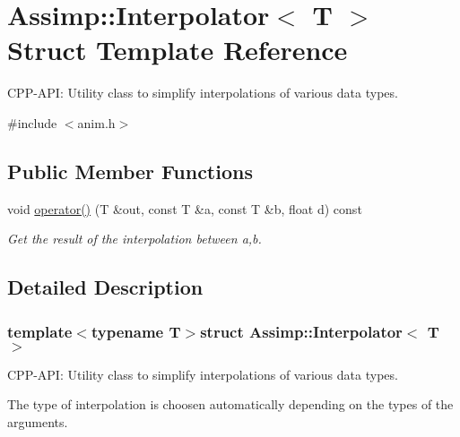 \hypertarget{struct_assimp_1_1_interpolator}{\section{Assimp\-:\-:Interpolator$<$ T $>$ Struct Template Reference}
\label{struct_assimp_1_1_interpolator}
}


C\-P\-P-\/\-A\-P\-I\-: Utility class to simplify interpolations of various data types.  




{\ttfamily \#include $<$anim.\-h$>$}

\subsection*{Public Member Functions}
\begin{DoxyCompactItemize}
\item 
void \hyperlink{struct_assimp_1_1_interpolator_a4ff39856f95c90eff9dfd7c9e1d83b87}{operator()} (T \&out, const T \&a, const T \&b, float d) const 
\begin{DoxyCompactList}\small\item\em Get the result of the interpolation between a,b. \end{DoxyCompactList}\end{DoxyCompactItemize}


\subsection{Detailed Description}
\subsubsection*{template$<$typename T$>$struct Assimp\-::\-Interpolator$<$ T $>$}

C\-P\-P-\/\-A\-P\-I\-: Utility class to simplify interpolations of various data types. 

The type of interpolation is choosen automatically depending on the types of the arguments. 

